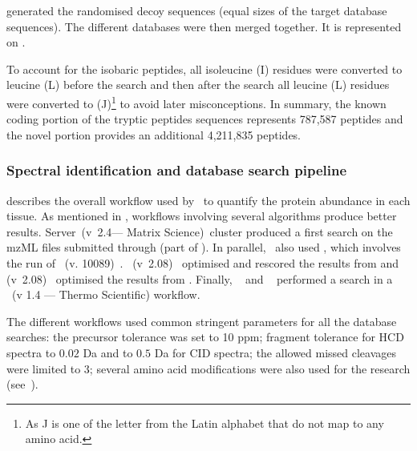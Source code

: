  generated the randomised
decoy sequences (equal sizes of the target database sequences).
The different databases were then merged together.
It is represented on .

To account for the isobaric peptides, all isoleucine (I) residues were
converted to leucine (L) before the search and then after the search all leucine
(L) residues were converted to (J)\footnote{As J is one of the letter
from the Latin alphabet that do not map to any amino acid.}
to avoid later misconceptions.
In summary, the known coding portion of the tryptic peptides sequences represents
787,587 peptides and the novel portion provides an additional 4,211,835 peptides.


\subsubsection{Spectral identification and database search pipeline}%
\label{subsub:spectralIDDBsearch}

 describes the overall workflow used by
\james\ to quantify the protein abundance in each tissue. As mentioned in
, workflows involving several algorithms produce
better results.  Server~(v~2.4--- Matrix Science)~cluster produced
a first search on the mzML files submitted through 
(part of ). In parallel, \james\ also used  ,
which involves the run of ~(v. 10089)~.
~(v~2.08)~
optimised and rescored the results from  and
 (v~2.08)~ optimised
the results from .
Finally, ~ and
~ performed a search in a
~(v 1.4 --- Thermo Scientific) workflow.

The different workflows used common stringent parameters for all the database
searches:
the precursor tolerance was set to 10 \gls{ppm};
fragment tolerance for \gls{HCD} spectra to $0.02$ \gls{Da} and
to $0.5$ \gls{Da} for \gls{CID} spectra;
the allowed missed cleavages were limited to $3$;
several amino acid modifications were
also used for the research (see~\citet{Wright-2016}).

